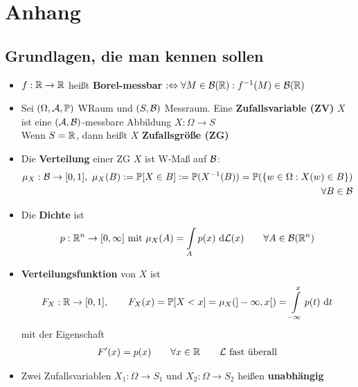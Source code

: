 
\setcounter{chapter}{0}
\renewcommand{\thechapter}{\Alph{chapter}}
\chapter{Anhang}

\setcounter{equation}{1}
\section{Grundlagen, die man kennen sollen}
\begin{itemize}
	\item $f:\mathbb{R}\to\mathbb{R}$ heißt \textbf{Borel-messbar} $:\Leftrightarrow\forall M\in\mathcal{B}(\mathbb{R}):f^{-1}(M)\in\mathcal{B}(\mathbb{R})$
	\item Sei $(\Omega,\mathcal{A}, \mathbb{P})$ WRaum und $(S,\mathcal{B})$ Messraum. Eine \textbf{Zufallsvariable (ZV)} $X$ ist eine $(\mathcal{A},\mathcal{B})$-messbare Abbildung $X:\Omega\to S$\\
	Wenn $S=\mathbb{R}$, dann heißt $X$ \textbf{Zufallsgröße (ZG)}
	\item Die \textbf{Verteilung} einer ZG $X$ ist W-Maß auf $\mathcal{B}$:
	\begin{align*}
		\mu_X:\mathcal{B}\to[0,1],~
		\mu_X(B):=\mathbb{P}[X\in B]:=\mathbb{P}(X^{-1}(B))=\mathbb{P}(\lbrace w\in\Omega:X(w)\in B\rbrace)\\\forall B\in\mathcal{B}
	\end{align*}
	\item Die \textbf{Dichte} ist
	\begin{align*}
		p:\mathbb{R}^n\to[0,\infty]\text{ mit } \mu_X(A)=\int\limits_A p(x)\text{ d}\mathcal{L}(x)\qquad\forall A\in\mathcal{B}(\mathbb{R}^n)
	\end{align*}
	\item \textbf{Verteilungsfunktion} von $X$ ist
	\begin{align*}
		F_X:\mathbb{R}\to[0,1],\qquad F_X(x)=\mathbb{P}[X<x]=\mu_X(]-\infty,x[)=\int\limits_{-\infty}^x p(t)\text{ d} t
	\end{align*}
	mit der Eigenschaft
	\begin{align*}
		F'(x)=p(x)\qquad\forall x\in\mathbb{R}\qquad\mathcal{L}\text{ fast überall}
	\end{align*}
	\item Zwei Zufallsvariablen $X_1:\Omega\to S_1$ und $X_2:\Omega\to S_2$ heißen \textbf{unabhängig} 
	\begin{align*}

\end{align*}
\end{itemize}
